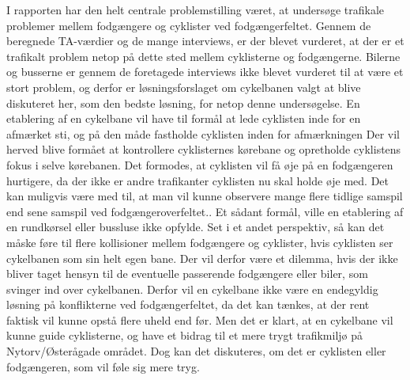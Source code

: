I rapporten har den helt centrale problemstilling været, at undersøge trafikale problemer mellem fodgængere og cyklister ved fodgængerfeltet. Gennem de beregnede TA-værdier og de mange interviews, er der blevet vurderet, at der er et trafikalt problem netop på dette sted mellem cyklisterne og fodgængerne. Bilerne og busserne er gennem de foretagede interviews ikke blevet vurderet til at være et stort problem, og derfor er løsningsforslaget om cykelbanen valgt at blive diskuteret her, som den bedste løsning, for netop denne undersøgelse.
En etablering af en cykelbane vil have til formål at lede cyklisten inde for en afmærket sti, og på den måde fastholde cyklisten inden for afmærkningen Der vil herved blive formået at kontrollere cyklisternes kørebane og opretholde cyklistens fokus i selve kørebanen. Det formodes, at cyklisten vil få øje på en fodgængeren hurtigere, da der ikke er andre trafikanter cyklisten nu skal holde øje med. Det kan muligvis være med til, at man vil kunne observere mange flere tidlige samspil end sene samspil ved fodgængeroverfeltet.. Et sådant formål, ville en etablering af en rundkørsel eller bussluse ikke opfylde. Set i et andet perspektiv, så kan det måske føre til flere kollisioner mellem fodgængere og cyklister, hvis cyklisten ser cykelbanen som sin helt egen bane. Der vil derfor være et dilemma, hvis der ikke bliver taget hensyn til de eventuelle passerende fodgængere eller biler, som svinger ind over cykelbanen. Derfor vil en cykelbane ikke være en endegyldig løsning på konflikterne ved fodgængerfeltet, da det kan tænkes, at der rent faktisk vil kunne opstå flere uheld end før. Men det er klart, at en cykelbane vil kunne guide cyklisterne, og have et bidrag til et mere trygt trafikmiljø på Nytorv/Østerågade området. Dog kan det diskuteres, om det er cyklisten eller fodgængeren, som vil føle sig mere tryg.
